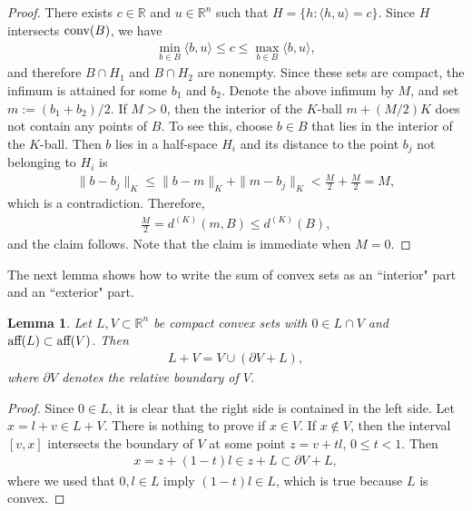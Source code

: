 \documentclass[11pt]{article}
\newtheorem{lemma}{Lemma}[section]
\begin{document}
\begin{proof}
    There exists $c\in \mathbb{R}$ and $u\in \mathbb{R}^n$ such that $H=\{h:\langle h,u\rangle =c\}$. Since $H$ intersects $\textup{conv}(B)$, we have
    \begin{align*}
        \min_{b\in B}\langle b,u\rangle\leq c\leq \max_{b\in B}\langle b,u\rangle,
    \end{align*}
    and therefore $B\cap H_1$ and $B\cap H_2$ are nonempty. Since these sets are compact, the infimum is attained for some $b_1$ and $b_2$. Denote the above infimum by $M$, and set $m:=(b_1+b_2)/2$. If $M>0$, then the interior of the $K$-ball $m+(M/2)K$ does not contain any points of $B$. To see this, choose $b\in B$ that lies in the interior of the $K$-ball. Then $b$ lies in a half-space $H_i$ and its distance to the point $b_j$ not belonging to $H_i$ is
    \begin{align*}
        \|b-b_j\|_K\leq \|b-m\|_K+\|m-b_j\|_K<\frac{M}{2}+\frac{M}{2}=M,
    \end{align*}
    which is a contradiction. Therefore,
    \begin{align*}
        \frac{M}{2}=d^{(K)}(m,B)\leq d^{(K)}(B),
    \end{align*}
    and the claim follows. Note that the claim is immediate when $M=0$.
\end{proof}

The next lemma shows how to write the sum of convex sets as an ``interior" part and an ``exterior" part. 

\begin{lemma}\label{lemma:sum_decomposition}
    Let $L,V\subset\mathbb{R}^n$ be compact convex sets with $0\in L\cap V$ and $\textup{aff}(L)\subset \textup{aff}(V)$. Then
    \begin{align*}
        L+V=V\cup (\partial V+L),
    \end{align*}
    where $\partial V$ denotes the relative boundary of $V$.
\end{lemma}

\begin{proof}
    Since $0\in L$, it is clear that the right side is contained in the left side. Let $x=l+v\in L+V$. There is nothing to prove if $x\in V$. If $x\notin V$, then the interval $[v,x]$ intersects the boundary of $V$ at some point $z=v+tl$, $0\leq t<1$. Then
    \begin{align*}
        x=z+(1-t)l\in z+L\subset \partial V+L,
    \end{align*}
    where we used that $0,l\in L$ imply $(1-t)l\in L$, which is true because $L$ is convex.
\end{proof}
\end{document}
